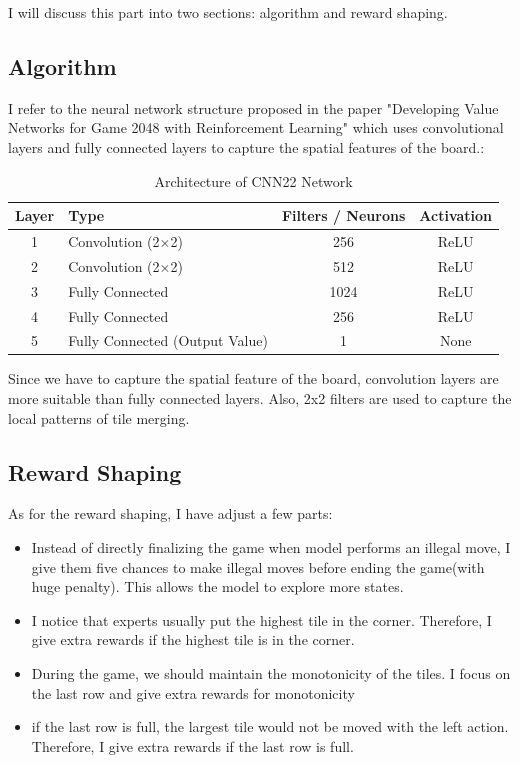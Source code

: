 \documentclass[a4paper]{article}
\begin{document}
    \begin{answer}
        I will discuss this part into two sections: algorithm and reward shaping.
        \subsection{Algorithm}
        I refer to the neural network structure proposed in the paper "Developing Value Networks for Game 2048
with Reinforcement Learning" which uses convolutional layers and fully connected layers to capture the spatial features of the board.:
        \begin{table}[H]
            \centering
            \caption{Architecture of CNN22 Network}
            \begin{tabular}{clcc}
                \hline
                Layer & Type & Filters / Neurons & Activation \\ \hline
                1 & Convolution (2$\times$2) & 256 & ReLU \\
                2 & Convolution (2$\times$2) & 512 & ReLU \\
                3 & Fully Connected & 1024 & ReLU \\
                4 & Fully Connected & 256 & ReLU \\
                5 & Fully Connected (Output Value) & 1 & None \\ \hline
            \end{tabular}
        \end{table}
        Since we have to capture the spatial feature of the board, convolution layers are more suitable than fully connected layers.
        Also, 2x2 filters are used to capture the local patterns of tile merging.
        \subsection{Reward Shaping}
        As for the reward shaping, I have adjust a few parts:
        \begin{itemize}
            \item Instead of directly finalizing the game when model performs an illegal move, I give 
            them five chances to make illegal moves before ending the game(with huge penalty). This allows the model to explore more states.
            \item I notice that experts usually put the highest tile in the corner. Therefore, I give extra rewards if the highest tile is in the corner.
            \item During the game, we should maintain the monotonicity of the tiles. I focus on the last row and give extra rewards for monotonicity
            \item if the last row is full, the largest tile would not be moved with the left action. Therefore, I give extra rewards if the last row is full.
        \end{itemize}

    \end{answer}
\end{document}
